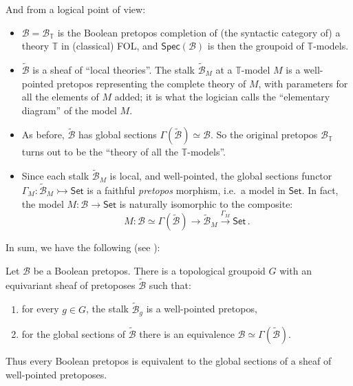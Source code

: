 \documentclass[graybox]{svmult}
\newcommand{\T}{\ensuremath{\mathbb{T}}}
\newcommand{\BB}{\ensuremath{\mathcal{B}}}
\newcommand{\Set}{\ensuremath{\mathsf{Set}}}
\begin{document}
And from a logical point of view:
\begin{itemize}
\item $\mathcal{B}= \mathcal{B}_\T$ is the Boolean pretopos completion of (the syntactic category of) a theory $\T$ in (classical) FOL, and  
$\mathsf{Spec}(\mathcal{B})$ is then the groupoid of $\T$-models.

\item $\widetilde{\mathcal{B}}$ is a sheaf of ``local theories''.  The stalk $\widetilde{\mathcal{B}}_M$ at a $\T$-model $M$ is a well-pointed pretopos representing the complete theory of $M$, with parameters for all the elements of $M$ added; it is what the logician calls the ``elementary diagram'' of the model $M$.

\item As before, $\widetilde{\mathcal{B}}$ has global sections $\Gamma(\widetilde{\mathcal{B}}) \simeq \mathcal{B}$.  So the original pretopos $\mathcal{B}_\T$ turns out to be the ``theory of all the $\T$-models''.

\item Since each stalk $\widetilde{\mathcal{B}}_M$ is local, and well-pointed,  the global sections functor $\Gamma_M : \widetilde{\mathcal{B}}_M \rightarrowtail \Set$ is a faithful \emph{pretopos} morphism, i.e.\ a model in $\Set$.  In fact, the model $M:\mathcal{B}\to\Set$  is naturally  isomorphic to the composite:
\[
M : \mathcal{B} \simeq \Gamma(\widetilde{\mathcal{B}}) \to \widetilde{\mathcal{B}}_M \stackrel{\Gamma_M}{\to} \Set\,.
\]
\end{itemize}

In sum, we have the following (see \cite{AB,B}):

\begin{theorem}
Let $\BB$ be a Boolean pretopos.  
There is a topological groupoid $G$ with an equivariant sheaf of pretoposes $\widetilde{\BB}$ such that:
\begin{enumerate}
\item for every $g\in G$, the stalk $\widetilde{\BB}_g$ is a well-pointed pretopos, 
\item for the global sections of $\widetilde{\BB}$ there is an equivalence $\BB\simeq\Gamma(\widetilde{\BB})$.
\end{enumerate}
Thus every Boolean pretopos is equivalent to the global sections of a sheaf of well-pointed pretoposes.  
\end{theorem}
\medskip
\end{document}
